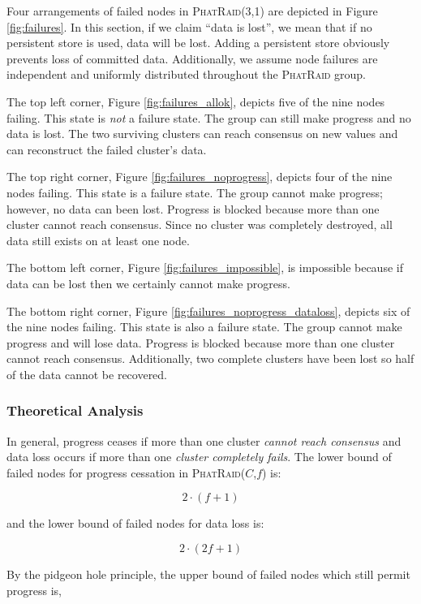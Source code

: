\documentclass[10pt,letter]{article}
\newcommand{\phatraid}[0]{\textsc{PhatRaid}}
\newcommand{\phatraidcf}[2]{\textsc{PhatRaid}(#1,#2)}
\begin{document}
Four arrangements of failed nodes in \phatraidcf{3}{1} are depicted in Figure
\ref{fig:failures}. In this section, if we claim ``data is lost'', we mean that
if no persistent store is used, data will be lost. Adding a persistent store
obviously prevents loss of committed data. Additionally, we assume node failures
are independent and uniformly distributed throughout the \phatraid{} group.

The top left corner, Figure \ref{fig:failures_allok}, depicts five of the nine
nodes failing. This state is \emph{not} a failure state. The group can still
make progress and no data is lost. The two surviving clusters can reach
consensus on new values and can reconstruct the failed cluster's data.

The top right corner, Figure \ref{fig:failures_noprogress}, depicts four of the
nine nodes failing. This state is a failure state. The group cannot make
progress; however, no data can been lost. Progress is blocked because more than
one cluster cannot reach consensus. Since no cluster was completely destroyed,
all data still exists on at least one node.

The bottom left corner, Figure \ref{fig:failures_impossible}, is impossible
because if data can be lost then we certainly cannot make progress.

The bottom right corner, Figure \ref{fig:failures_noprogress_dataloss}, depicts
six of the nine nodes failing. This state is also a failure state. The group
cannot make progress and will lose data. Progress is blocked because more than
one cluster cannot reach consensus. Additionally, two complete clusters have
been lost so half of the data cannot be recovered.

\subsubsection{Theoretical Analysis}

In general, progress ceases if more than one cluster \emph{cannot reach
  consensus} and data loss occurs if more than one \emph{cluster completely
  fails}. The lower bound of failed nodes for progress cessation in
\phatraidcf{$C$}{$f$} is:

    $$ 2\cdot(f+1) $$

and the lower bound of failed nodes for data loss is:

    $$ 2\cdot(2f+1) $$

By the pidgeon hole principle, the upper bound of failed nodes which still
permit progress is,
\end{document}
